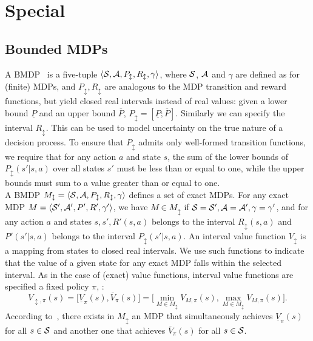 \section{Special } \label{sec:specmdp}

\subsection{Bounded \ac{MDPs}}
A \acf{BMDP}~\citep[]{givan2000bounded} is a five-tuple $\langle \mathcal{S}, \mathcal{A}, P_{\updownarrow}, R_{\updownarrow}, \gamma \rangle$, where $\mathcal{S}$, $\mathcal{A}$ and $\gamma$ are defined as for (finite) MDPs, and $P_{\updownarrow}, R_{\updownarrow}$ are analogous to the MDP transition and reward functions, but yield closed real intervals instead of real values: given a lower bound $\underline{P}$ and an upper bound $\overline{P}$, $P_{\updownarrow} = [\underline{P}; \overline{P}]$. Similarly we can specify the interval $R_{\updownarrow}$. This can be used to model uncertainty on the true nature of a decision process. To ensure that $P_{\updownarrow}$ admits only well-formed transition functions, we require that for any action $a$ and state $s$, the sum of the lower bounds of $P_{\updownarrow}(s'|s,a)$ over all states $s'$ must be less than or equal to one, while the upper bounds must sum to a value greater than or equal to one.\\
\newline
A BMDP $M_{\updownarrow} = \langle \mathcal{S}, \mathcal{A}, P_{\updownarrow}, R_{\updownarrow}, \gamma \rangle$ defines a set of exact MDPs. For any exact MDP $M = \langle \mathcal{S}', \mathcal{A}', P', R', \gamma' \rangle$, we have $M \in M_{\updownarrow}$ if $\mathcal{S} = \mathcal{S}', \mathcal{A} = \mathcal{A}', \gamma = \gamma'$, and for any action $a$ and states $s, s', R'(s,a)$ belongs to the interval $R_{\updownarrow}(s,a)$ and $P'(s'|s,a)$ belongs to the interval $P_{\updownarrow}(s'|s,a)$. An interval value function $V_{\updownarrow}$ is a mapping from states to closed real intervals. We use such functions to indicate that the value of a given state for any exact MDP falls within the selected interval. As in the case of (exact) value functions, interval value functions are specified \wrt a fixed policy $\pi$, \ie:
$$V_{\updownarrow, \pi}(s) = \Big[ \underline{V}_{\pi}(s), \overline{V}_{\pi}(s)\Big] = \Big[ \min_{M \in M_{\updownarrow}} V_{M,\pi}(s), \max_{M \in M_{\updownarrow}} V_{M,\pi}(s)\Big].$$
According to~\citep{givan2000bounded}, there exists in $M_{\updownarrow}$ an \ac{MDP} that simultaneously achieves $\underline{V}_{\pi}(s)$ for all $s \in \mathcal{S}$ and another one that achieves $\overline{V}_{\pi}(s)$ for all $s \in \mathcal{S}$.\\
